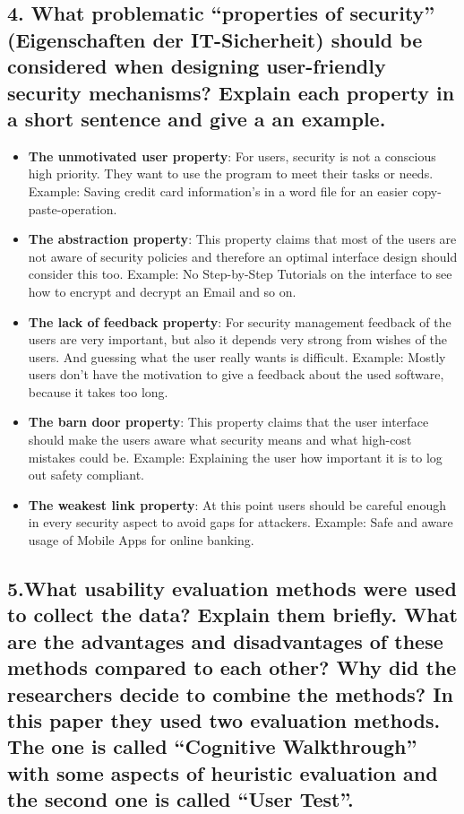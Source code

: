 \subsection{4. What problematic “properties of security” (Eigenschaften der IT-Sicherheit) should be considered when designing user-friendly security mechanisms? Explain each property in a short sentence and give a an example. }

\begin{itemize}

	\item \textbf{The unmotivated user property}:
	For users, security is not a conscious high priority. They want to use the program to meet their tasks or needs. Example: Saving credit card information’s in a word file for an easier copy-paste-operation.


	\item \textbf{The abstraction property}: 
	This property claims that most of the users are not aware of security policies and therefore an optimal interface design should consider this too. Example: No Step-by-Step Tutorials on the interface to see how to encrypt and decrypt an Email and so on. 


	\item \textbf{The lack of feedback property}: 
	For security management feedback of the users are very important, but also it depends very strong from wishes of the users. And guessing what the user really wants is difficult. Example: Mostly users don’t have the motivation to give a feedback about the used software, because it takes too long.


	\item\textbf{The barn door property}: 
	This property claims that the user interface should make the users aware what security means and what high-cost mistakes could be. Example: Explaining the user how important it is to log out safety compliant. 


	\item\textbf{The weakest link property}:
	 At this point users should be careful enough in every security aspect to avoid gaps for attackers. Example: Safe and aware usage of Mobile Apps for online banking.

\end{itemize}

\subsection{5.What usability evaluation methods were used to collect the data? Explain them briefly. What are the advantages and disadvantages of these methods compared to each other? Why did the researchers decide to combine the methods? 
In this paper they used two evaluation methods. The one is called “Cognitive Walkthrough” with some aspects of heuristic evaluation and the second one is called “User Test”. }

